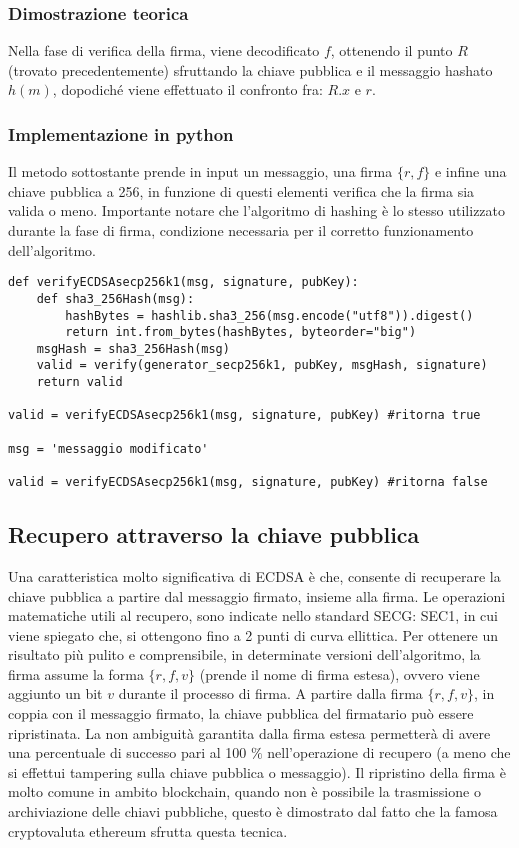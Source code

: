 \subsubsection{Dimostrazione teorica}

Nella fase di verifica della firma, viene decodificato $f$, ottenendo il punto $R$ (trovato precedentemente) sfruttando la chiave pubblica e il messaggio hashato $h(m)$, dopodiché viene effettuato il confronto fra: $R.x$ e $r$. 

\subsubsection{Implementazione in python}

Il metodo sottostante prende in input un messaggio, una firma $\{r, f\}$ e infine una chiave pubblica a 256, in funzione di questi elementi verifica che la firma sia valida o meno. Importante notare che l'algoritmo di hashing è lo stesso utilizzato durante la fase di firma, condizione necessaria per il corretto funzionamento dell'algoritmo.

\begin{lstlisting}
def verifyECDSAsecp256k1(msg, signature, pubKey):
	def sha3_256Hash(msg):
		hashBytes = hashlib.sha3_256(msg.encode("utf8")).digest()
		return int.from_bytes(hashBytes, byteorder="big")
	msgHash = sha3_256Hash(msg)
	valid = verify(generator_secp256k1, pubKey, msgHash, signature)
	return valid
	
valid = verifyECDSAsecp256k1(msg, signature, pubKey) #ritorna true

msg = 'messaggio modificato'

valid = verifyECDSAsecp256k1(msg, signature, pubKey) #ritorna false
\end{lstlisting}

\newpage

\subsection{Recupero attraverso la chiave pubblica}

Una caratteristica molto significativa di ECDSA è che, consente di recuperare la chiave pubblica a partire dal messaggio firmato, insieme alla firma. Le operazioni matematiche utili al recupero, sono indicate nello standard SECG: SEC1, in cui viene spiegato che, si ottengono fino a 2 punti di curva ellittica. Per ottenere un risultato più pulito e comprensibile, in determinate versioni dell'algoritmo, la firma assume la forma $\{r, f, v\}$ (prende il nome di firma estesa), ovvero viene aggiunto un bit $v$ durante il processo di firma. A partire dalla firma $\{r, f, v\}$, in coppia con il messaggio firmato, la chiave pubblica del firmatario può essere ripristinata. La non ambiguità garantita dalla firma estesa permetterà di avere una percentuale di successo pari al 100 $\%$ nell'operazione di recupero (a meno che si effettui tampering sulla chiave pubblica o messaggio). Il ripristino della firma è molto comune in ambito blockchain, quando non è possibile la trasmissione o archiviazione delle chiavi pubbliche, questo è dimostrato dal fatto che la famosa cryptovaluta ethereum sfrutta questa tecnica.

